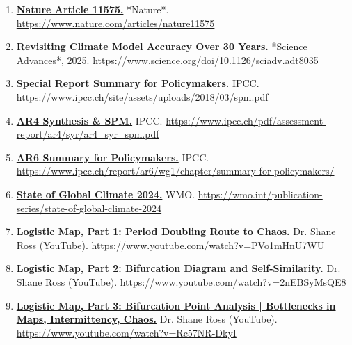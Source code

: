 \documentclass[
  10pt,
  a4paper,
  DIV=11,
  numbers=noendperiod,
  open=any]{scrreprt}
\numberwithin{equation}{chapter}
\numberwithin{equation}{section}
\renewcommand{\[}{\begin{equation}}
\renewcommand{\]}{\end{equation}}
\begin{document}
\begin{enumerate}
  \item \label{ref:web24}\href{https://www.nature.com/articles/nature11575}{\textbf{Nature Article 11575.}} *Nature*.  
  \url{https://www.nature.com/articles/nature11575}

  \item \label{ref:web25}\href{https://www.science.org/doi/10.1126/sciadv.adt8035}{\textbf{Revisiting Climate Model Accuracy Over 30 Years.}} *Science Advances*, 2025.  
  \url{https://www.science.org/doi/10.1126/sciadv.adt8035}

  \item \label{ref:web26}\href{https://www.ipcc.ch/site/assets/uploads/2018/03/spm.pdf}{\textbf{Special Report Summary for Policymakers.}} IPCC.  
  \url{https://www.ipcc.ch/site/assets/uploads/2018/03/spm.pdf}

  \item \label{ref:web27}\href{https://www.ipcc.ch/pdf/assessment-report/ar4/syr/ar4_syr_spm.pdf}{\textbf{AR4 Synthesis & SPM.}} IPCC.  
  \url{https://www.ipcc.ch/pdf/assessment-report/ar4/syr/ar4_syr_spm.pdf}

  \item \label{ref:web28}\href{https://www.ipcc.ch/report/ar6/wg1/chapter/summary-for-policymakers/}{\textbf{AR6 Summary for Policymakers.}} IPCC.  
  \url{https://www.ipcc.ch/report/ar6/wg1/chapter/summary-for-policymakers/}

  \item \label{ref:web29}\href{https://wmo.int/publication-series/state-of-global-climate-2024}{\textbf{State of Global Climate 2024.}} WMO.  
  \url{https://wmo.int/publication-series/state-of-global-climate-2024}

  \item \label{ref:web30}\href{https://www.youtube.com/watch?v=PVo1mHnU7WU}{\textbf{Logistic Map, Part 1: Period Doubling Route to Chaos.}} Dr. Shane Ross (YouTube).  
  \url{https://www.youtube.com/watch?v=PVo1mHnU7WU}

  \item \label{ref:web31}\href{https://www.youtube.com/watch?v=2nEBSyMsQE8}{\textbf{Logistic Map, Part 2: Bifurcation Diagram and Self-Similarity.}} Dr. Shane Ross (YouTube).  
  \url{https://www.youtube.com/watch?v=2nEBSyMsQE8}

  \item \label{ref:web32}\href{https://www.youtube.com/watch?v=Rc57NR-DkyI}{\textbf{Logistic Map, Part 3: Bifurcation Point Analysis | Bottlenecks in Maps, Intermittency, Chaos.}} Dr. Shane Ross (YouTube).  
  \url{https://www.youtube.com/watch?v=Rc57NR-DkyI}


\end{enumerate}
\end{document}

